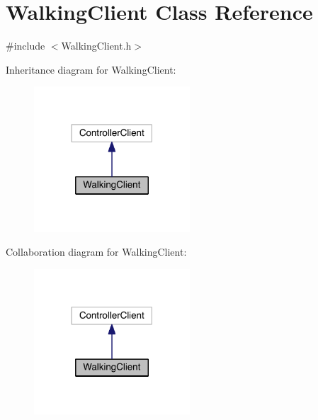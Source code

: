 \hypertarget{classWalkingClient}{}\section{Walking\+Client Class Reference}
\label{classWalkingClient}


{\ttfamily \#include $<$Walking\+Client.\+h$>$}



Inheritance diagram for Walking\+Client\+:\nopagebreak
\begin{figure}[H]
\begin{center}
\leavevmode
\includegraphics[width=165pt]{classWalkingClient__inherit__graph}
\end{center}
\end{figure}


Collaboration diagram for Walking\+Client\+:\nopagebreak
\begin{figure}[H]
\begin{center}
\leavevmode
\includegraphics[width=165pt]{classWalkingClient__coll__graph}
\end{center}
\end{figure}
